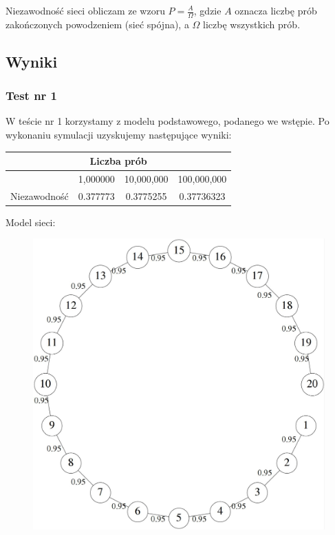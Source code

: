 \documentclass[titlepage]{article}
\begin{document}
Niezawodność sieci obliczam ze wzoru $P = \frac{A}{\Omega}$, gdzie $A$ oznacza liczbę prób zakończonych powodzeniem (sieć spójna), a $\Omega$ liczbę wszystkich prób.

\newpage
\subsection{Wyniki}
\subsubsection{Test nr 1}
W teście nr 1 korzystamy z modelu podstawowego, podanego we wstępie. Po wykonaniu symulacji uzyskujemy następujące wyniki:
\begin{table}[h!]
	\centering
    \label{tab:table1}
    \begin{tabular}{|c|c|c|c|}
    		\multicolumn{4}{c}{Liczba prób}\\
    		\hline
      	& 1,000000 & 10,000,000 & 100,000,000\\
      	\hline
      	Niezawodność & 0.377773 & 0.3775255 & 0.37736323\\
		\hline
    \end{tabular}
\end{table}

\noindent Model sieci:
\begin{figure}[h!]
	\centering
	\includegraphics[width=0.8\linewidth]{graph.jpg}
\end{figure}

\newpage
\end{document}
